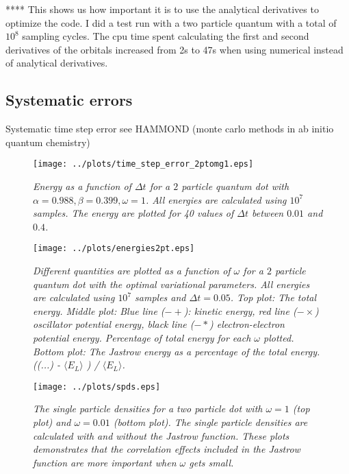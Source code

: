 \documentclass[a4paper,10pt,twocolumn]{article} %
\newcommand{\expec}[1]{\langle{}{#1}\rangle{}}
\begin{document}
****
This shows us how important it is to use the analytical derivatives to optimize the code. I did a test run with a two
particle quantum with a total of $10^8$ sampling cycles. The cpu time spent calculating the first and second derivatives 
of the orbitals increased from 2s to 47s when using numerical instead of analytical derivatives.


\subsection{Systematic errors}

Systematic time step error see HAMMOND (monte carlo methods in ab initio quantum chemistry)

\begin{figure}[h!]
\begin{center}
\caption{{\it%
			Energy as a function of $\Delta t$ for a $2$ particle quantum dot with $\alpha=0.988,\beta=0.399,\omega=1$. All energies are calculated using $10^7$ samples.
			The energy are plotted for 40 values of $\Delta t$ between $0.01$ and $0.4$. 
		}}
		\label{fig:ef}
	\texttt{[image: ../plots/time\_step\_error\_2ptomg1.eps]}
\end{center}
\end{figure}

\begin{figure}[h!]
\begin{center}
\caption{{\it%
			Different quantities are plotted as a function of $\omega$ for a $2$ particle quantum dot with the optimal variational parameters. 
			All energies are calculated using $10^7$ samples and $\Delta t = 0.05$.
			Top plot: The total energy.
			Middle plot:
			Blue line ($-+$): kinetic energy, red line ($-\times$) oscillator potential energy, black line ($-*$) electron-electron potential energy.
			Percentage of total energy for each $\omega$ plotted.
			Bottom plot: The Jastrow energy as a percentage of the total energy. ((...) - $\expec{E_L}$ ) / $\expec{E_L}$. 
		}}
		\label{figes}
	\texttt{[image: ../plots/energies2pt.eps]}
\end{center}
\end{figure}

\begin{figure}[h!]
\begin{center}
\caption{{\it%
		The single particle densities for a two particle dot with $\omega=1$ (top plot) and $\omega=0.01$ (bottom plot). 
		The single particle densities are calculated with and without the Jastrow function. These plots demonstrates that the correlation effects 
		included in the Jastrow function are more important when $\omega$ gets small.
		}}
		\label{fig:ef}
\vspace{.1cm}
	\texttt{[image: ../plots/spds.eps]}
\end{center}
\end{figure}
\end{document}
